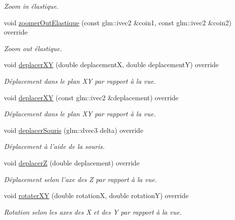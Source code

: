 \begin{DoxyCompactItemize}
\begin{DoxyCompactList}\small\item\em Zoom in élastique. \end{DoxyCompactList}\item 
\hypertarget{classvue_1_1_vue_orbite_af0aa02f9d344fbb94796362f9af45fbd}{void \hyperlink{classvue_1_1_vue_orbite_af0aa02f9d344fbb94796362f9af45fbd}{zoomer\-Out\-Elastique} (const glm\-::ivec2 \&coin1, const glm\-::ivec2 \&coin2) override}\label{classvue_1_1_vue_orbite_af0aa02f9d344fbb94796362f9af45fbd}

\begin{DoxyCompactList}\small\item\em Zoom out élastique. \end{DoxyCompactList}\item 
void \hyperlink{classvue_1_1_vue_orbite_a3ceda8aa84994f76fce6df0fae843771}{deplacer\-X\-Y} (double deplacement\-X, double deplacement\-Y) override
\begin{DoxyCompactList}\small\item\em Déplacement dans le plan X\-Y par rapport à la vue. \end{DoxyCompactList}\item 
void \hyperlink{classvue_1_1_vue_orbite_aea5a861511c24e0578b58bf740f375f7}{deplacer\-X\-Y} (const glm\-::ivec2 \&deplacement) override
\begin{DoxyCompactList}\small\item\em Déplacement dans le plan X\-Y par rapport à la vue. \end{DoxyCompactList}\item 
void \hyperlink{classvue_1_1_vue_orbite_a814930a72c4fb4b0e5c506e8c108bcbc}{deplacer\-Souris} (glm\-::dvec3 delta) override
\begin{DoxyCompactList}\small\item\em Déplacement à l'aide de la souris. \end{DoxyCompactList}\item 
void \hyperlink{classvue_1_1_vue_orbite_a3e2827f292984b40547c667fc46c6055}{deplacer\-Z} (double deplacement) override
\begin{DoxyCompactList}\small\item\em Déplacement selon l'axe des Z par rapport à la vue. \end{DoxyCompactList}\item 
void \hyperlink{classvue_1_1_vue_orbite_a74ddc90c22e3cecde830fc58d76e17c4}{rotater\-X\-Y} (double rotation\-X, double rotation\-Y) override
\begin{DoxyCompactList}\small\item\em Rotation selon les axes des X et des Y par rapport à la vue. \end{DoxyCompactList}\item 

\end{DoxyCompactItemize}
